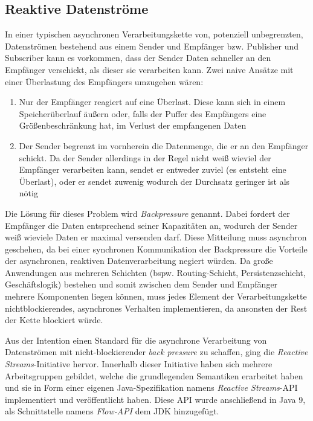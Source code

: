 \subsection{Reaktive Datenströme}
\label{section.reaktive_datenströme}
In einer typischen asynchronen Verarbeitungskette von, potenziell unbegrenzten, Datenströmen
bestehend aus einem Sender und Empfänger bzw. Publisher und Subscriber kann es vorkommen,
dass der Sender Daten schneller an den Empfänger verschickt, als dieser sie verarbeiten kann.
Zwei naive Ansätze mit einer Überlastung des Empfängers umzugehen wären:
\begin{enumerate}
    \item Nur der Empfänger reagiert auf eine Überlast. Diese kann sich in einem Speicherüberlauf äußern oder, falls der Puffer des Empfängers eine Größenbeschränkung
          hat, im Verlust der empfangenen Daten
    \item Der Sender begrenzt im vornherein die Datenmenge, die er an den Empfänger schickt. Da der Sender allerdings in der Regel nicht weiß wieviel der Empfänger
          verarbeiten kann, sendet er entweder zuviel (es entsteht eine Überlast), oder er sendet zuwenig wodurch der Durchsatz geringer ist als nötig
\end{enumerate}\parencite{JavaSpektrum2015}
Die Lösung für dieses Problem wird \textit{Backpressure} genannt.
Dabei fordert der Empfänger die Daten entsprechend seiner Kapazitäten an, wodurch der Sender weiß wieviele Daten er maximal versenden darf.
Diese Mitteilung muss asynchron geschehen, da bei einer synchronen Kommunikation der Backpressure die Vorteile der asynchronen, reaktiven Datenverarbeitung
negiert würden.
Da große Anwendungen aus mehreren Schichten (bspw. Routing-Schicht, Persistenzschicht, Geschäftslogik) bestehen und somit zwischen
dem Sender und Empfänger mehrere Komponenten liegen können, muss jedes
Element der Verarbeitungskette nichtblockierendes, asynchrones Verhalten implementieren, da ansonsten der Rest der Kette blockiert würde.

Aus der Intention einen Standard für die asynchrone Verarbeitung von Datenströmen mit nicht-blockierender \textit{back pressure}
zu schaffen, ging die \textit{Reactive Streams}-Initiative hervor.
Innerhalb dieser Initiative haben sich mehrere Arbeitsgruppen gebildet, welche die grundlegenden Semantiken erarbeitet haben und
sie in Form einer eigenen Java-Spezifikation namens \textit{Reactive Streams}-API implementiert und veröffentlicht haben.\parencite{ReactiveStreams}
Diese API wurde anschließend in Java 9, als Schnittstelle namens \textit{Flow-API} dem JDK hinzugefügt.

